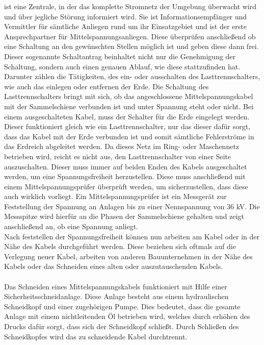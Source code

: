 ist eine Zentrale, in der das komplette Stromnetz der Umgebung überwacht wird und über jegliche Störung informiert wird. Sie ist Informationsempfänger und 
Vermittler für sämtliche Anliegen rund um ihr Einsatzgebiet und ist der erste Ansprechpartner für Mittelspannungsanliegen. Diese überprüfen anschließend ob 
eine Schaltung an den gewünschten Stellen möglich ist und geben diese dann frei. Dieser sogenannte Schaltantrag beinhaltet nicht nur die Genehmigung der 
Schaltung, sondern auch einen genauen Ablauf, wie diese stattzufinden hat. Darunter zählen die Tätigkeiten, des ein- oder ausschalten des Lasttrennschalters, 
wie auch das einlegen oder entfernen der Erde. Die Schaltung des Lasttrennschalters bringt mit sich, ob das angeschlossene Mittelspannungskabel mit der 
Sammelschiene verbunden ist und unter Spannung steht oder nicht. Bei einem ausgeschalteten Kabel, muss der Schalter für die Erde eingelegt werden. Dieser 
funktioniert gleich wie ein Lasttrennschalter, nur das dieser dafür sorgt, dass das Kabel mit der Erde verbunden ist und somit sämtliche Fehlerströme in das 
Erdreich abgeleitet werden. Da dieses Netz im Ring- oder Maschennetz betrieben wird, reicht es nicht aus, den Lasttrennschalter von einer Seite auszuschalten. 
Dieser muss immer auf beiden Enden des Kabels ausgeschaltet werden, um eine Spannungsfreiheit herzustellen. Diese muss anschließend mit einem 
Mittelspannungsprüfer überprüft werden, um sicherzustellen, dass diese auch wirklich vorliegt. Ein Mittelspannungsprüfer ist ein Messgerät zur 
Feststellung der Spannung an Anlagen bis zu einer Nennspannung von 36 kV. Die Messspitze wird hierfür an die Phasen der Sammelschiene gehalten und 
zeigt anschließend an, ob eine Spannung anliegt. \autocite{Pfisterer.}
\\
Nach feststellen der Spannungsfreiheit können nun arbeiten am Kabel oder in der Nähe des Kabels durchgeführt werden. Diese beziehen sich oftmals auf die 
Verlegung neuer Kabel, arbeiten von anderen Bauunternehmen in der Nähe des Kabels oder das Schneiden eines alten oder auszutauschenden Kabels.
\\\\
Das Schneiden eines Mittelspannungskabels funktioniert mit Hilfe einer Sicherheitsschneidanlage. Diese Anlage besteht aus einem hydraulischen Schneidkopf 
und einer zugehörigen Pumpe. Dies bedeutet, dass die gesamte Anlage mit einem nichtleitenden Öl betrieben wird, welches durch erhöhen des Drucks dafür sorgt, 
dass sich der Schneidkopf schließt. Durch Schließen des Schneidkopfes wird das zu schneidende Kabel durchtrennt.
